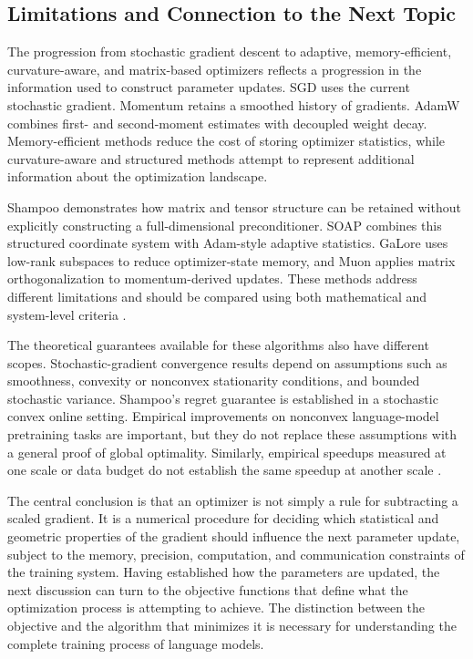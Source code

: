 \subsection{Limitations and Connection to the Next Topic}
\label{subsec:optimization-limitations-transition}

The progression from stochastic gradient descent to adaptive,
memory-efficient, curvature-aware, and matrix-based optimizers
reflects a progression in the information used to construct
parameter updates. SGD uses the current stochastic gradient.
Momentum retains a smoothed history of gradients. AdamW combines
first- and second-moment estimates with decoupled weight decay.
Memory-efficient methods reduce the cost of storing optimizer
statistics, while curvature-aware and structured methods attempt
to represent additional information about the optimization
landscape.

Shampoo demonstrates how matrix and tensor structure can be
retained without explicitly constructing a full-dimensional
preconditioner. SOAP combines this structured coordinate system
with Adam-style adaptive statistics. GaLore uses low-rank
subspaces to reduce optimizer-state memory, and Muon applies
matrix orthogonalization to momentum-derived updates. These
methods address different limitations and should be compared
using both mathematical and system-level criteria
\parencite{Gupta2018Shampoo,Vyas2025SOAP,Ranganath2026Navigating}.

The theoretical guarantees available for these algorithms also
have different scopes. Stochastic-gradient convergence results
depend on assumptions such as smoothness, convexity or
nonconvex stationarity conditions, and bounded stochastic
variance. Shampoo's regret guarantee is established in a
stochastic convex online setting. Empirical improvements on
nonconvex language-model pretraining tasks are important, but
they do not replace these assumptions with a general proof of
global optimality. Similarly, empirical speedups measured at
one scale or data budget do not establish the same speedup at
another scale \parencite{Bottou2018Optimization,Gupta2018Shampoo,
Vyas2025SOAP,Wen2026Fantastic}.

The central conclusion is that an optimizer is not simply a
rule for subtracting a scaled gradient. It is a numerical
procedure for deciding which statistical and geometric
properties of the gradient should influence the next parameter
update, subject to the memory, precision, computation, and
communication constraints of the training system. Having
established how the parameters are updated, the next discussion
can turn to the objective functions that define what the
optimization process is attempting to achieve. The distinction
between the objective and the algorithm that minimizes it is
necessary for understanding the complete training process of
language models.

